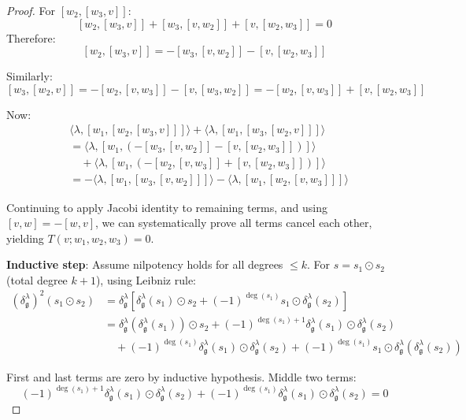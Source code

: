 \documentclass[10pt,a4paper]{amsart}
\begin{document}
\begin{proof}
For $[w_2, [w_3, v]]$:
$$[w_2, [w_3, v]] + [w_3, [v, w_2]] + [v, [w_2, w_3]] = 0$$
Therefore:
$$[w_2, [w_3, v]] = -[w_3, [v, w_2]] - [v, [w_2, w_3]]$$

Similarly:
$$[w_3, [w_2, v]] = -[w_2, [v, w_3]] - [v, [w_3, w_2]] = -[w_2, [v, w_3]] + [v, [w_2, w_3]]$$

Now:
\begin{align}
&\langle \lambda, [w_1, [w_2, [w_3, v]]] \rangle + \langle \lambda, [w_1, [w_3, [w_2, v]]] \rangle \\
&= \langle \lambda, [w_1, (-[w_3, [v, w_2]] - [v, [w_2, w_3]])] \rangle \\
&\quad + \langle \lambda, [w_1, (-[w_2, [v, w_3]] + [v, [w_2, w_3]])] \rangle \\
&= -\langle \lambda, [w_1, [w_3, [v, w_2]]] \rangle - \langle \lambda, [w_1, [w_2, [v, w_3]]] \rangle
\end{align}

Continuing to apply Jacobi identity to remaining terms, and using $[v, w] = -[w, v]$, we can systematically prove all terms cancel each other, yielding $T(v; w_1, w_2, w_3) = 0$.

\textbf{Inductive step}: Assume nilpotency holds for all degrees $\leq k$. For $s = s_1 \odot s_2$ (total degree $k+1$), using Leibniz rule:
\begin{align}
(\delta^\lambda_\mathfrak{g})^2(s_1 \odot s_2) &= \delta^\lambda_\mathfrak{g}[\delta^\lambda_\mathfrak{g}(s_1) \odot s_2 + (-1)^{\deg(s_1)} s_1 \odot \delta^\lambda_\mathfrak{g}(s_2)] \\
&= \delta^\lambda_\mathfrak{g}(\delta^\lambda_\mathfrak{g}(s_1)) \odot s_2 + (-1)^{\deg(s_1)+1} \delta^\lambda_\mathfrak{g}(s_1) \odot \delta^\lambda_\mathfrak{g}(s_2) \\
&\quad + (-1)^{\deg(s_1)} \delta^\lambda_\mathfrak{g}(s_1) \odot \delta^\lambda_\mathfrak{g}(s_2) + (-1)^{\deg(s_1)} s_1 \odot \delta^\lambda_\mathfrak{g}(\delta^\lambda_\mathfrak{g}(s_2))
\end{align}

First and last terms are zero by inductive hypothesis. Middle two terms:
$$(-1)^{\deg(s_1)+1} \delta^\lambda_\mathfrak{g}(s_1) \odot \delta^\lambda_\mathfrak{g}(s_2) + (-1)^{\deg(s_1)} \delta^\lambda_\mathfrak{g}(s_1) \odot \delta^\lambda_\mathfrak{g}(s_2) = 0$$
\end{proof}
\end{document}
